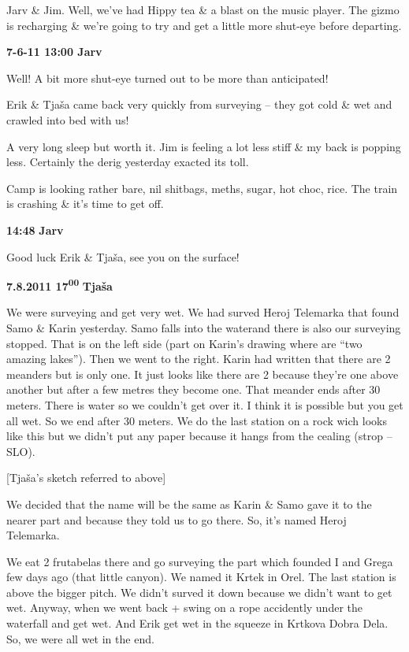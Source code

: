 Jarv \& Jim. Well, we've had Hippy tea \& a blast on the music player.
The gizmo is recharging \& we're going to try and get a little more
shut-eye before departing.

\textbf{7-6-11 13:00 Jarv}

Well! A bit more shut-eye turned out to be more than anticipated!

Erik \& Tjaša came back very quickly from surveying -- they got cold \&
wet and crawled into bed with us!

A very long sleep but worth it. Jim is feeling a lot less stiff \& my
back is popping less. Certainly the derig yesterday exacted its toll.

Camp is looking rather bare, nil shitbags, meths, sugar, hot choc, rice.
The train is crashing \& it's time to get off.

\textbf{14:48} \textbf{Jarv}

Good luck Erik \& Tjaša, see you on the surface!

\textbf{7.8.2011 17\textsuperscript{00}} \textbf{Tjaša}

We were surveying and get very wet. We had surved Heroj Telemarka that
found Samo \& Karin yesterday. Samo falls into the waterand there is
also our surveying stopped. That is on the left side (part on Karin's
drawing where are ``two amazing lakes''). Then we went to the right.
Karin had written that there are 2 meanders but is only one. It just
looks like there are 2 because they're one above another but after a few
metres they become one. That meander ends after 30 meters. There is
water so we couldn't get over it. I think it is possible but you get all
wet. So we end after 30 meters. We do the last station on a rock wich
looks like this but we didn't put any paper because it hangs from the
cealing (strop -- SLO).

{[}Tjaša's sketch referred to above{]}

We decided that the name will be the same as Karin \& Samo gave it to
the nearer part and because they told us to go there. So, it's named
Heroj Telemarka.

We eat 2 frutabelas there and go surveying the part which founded I and
Grega few days ago (that little canyon). We named it Krtek in Orel. The
last station is above the bigger pitch. We didn't surved it down because
we didn't want to get wet. Anyway, when we went back + swing on a rope
accidently under the waterfall and get wet. And Erik get wet in the
squeeze in Krtkova Dobra Dela. So, we were all wet in the end.


